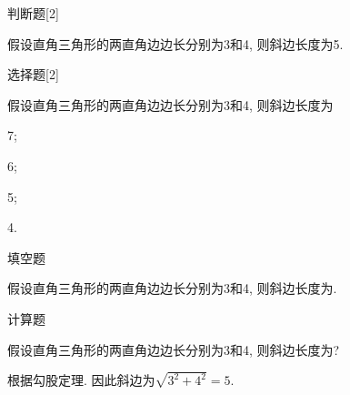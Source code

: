 \documentclass{article}
\begin{document}
\makehead
\begin{makepart}{判断题}[2]
\begin{problem}
  假设直角三角形的两直角边边长分别为3和4, 则斜边长度为5. \true
\end{problem}
\end{makepart}
\begin{makepart}{选择题}[2]
\begin{problem}
  假设直角三角形的两直角边边长分别为3和4, 则斜边长度为
\begin{abcd}
 \item 7;
 \item 6;
 \item 5;
 \item 4.
\end{abcd}
\end{problem}
\end{makepart}
\begin{makepart}{填空题}
\begin{problem}[2]
  假设直角三角形的两直角边边长分别为3和4, 则斜边长度为.
\end{problem}
\end{makepart}
\begin{makepart}{计算题}
\begin{problem}[10]
  假设直角三角形的两直角边边长分别为3和4, 则斜边长度为?
\begin{solution}[10em]
  根据勾股定理.
  因此斜边为$\sqrt{3^2+4^2}=5$.
\end{solution}
\end{problem}
\end{makepart}
\end{document}
